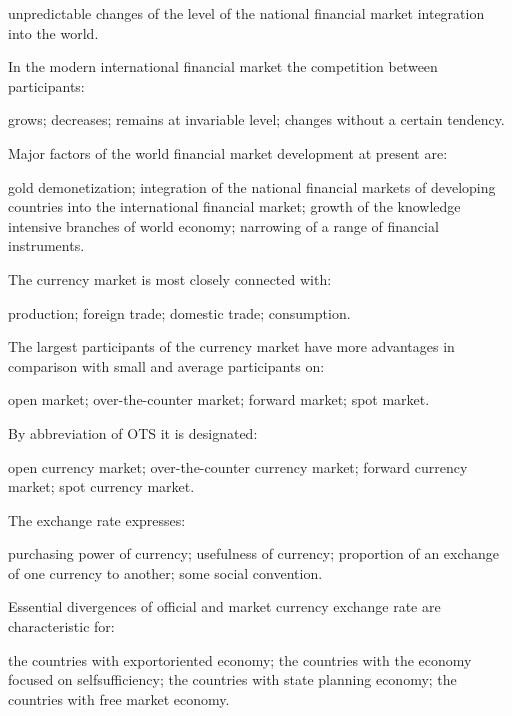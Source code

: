 \documentclass[12pt, table]{exam}
\begin{document}
\begin{questions}
\begin{multicols}{2}
\begin{choices}
	 \choice unpredictable changes of the level of the national financial market integration into the world.
	 \end{choices}
\question In the modern international financial market the competition between participants:
	 \begin{choices}
	 \CC grows;
	 \choice decreases;
	 \choice remains at invariable level;
	 \choice changes without a certain tendency.
	 \end{choices}
\question Major factors of the world financial market development at present are:
	 \begin{choices}
	 \choice gold demonetization;
	 \CC integration of the national financial markets of developing countries into the international financial market;
	 \choice growth of the knowledge intensive branches of world economy;
	 \choice narrowing of a range of financial instruments.
	 \end{choices}
\question The currency market is most closely connected with:
	 \begin{choices}
	 \choice production;
	 \CC foreign trade;
	 \choice domestic trade;
	 \choice consumption.
	 \end{choices}
\question The largest participants of the currency market have more advantages in comparison with small and average participants on:
	 \begin{choices}
	 \choice open market;
	 \CC over-the-counter market;
	 \choice forward market;
	 \choice spot market.
	 \end{choices}
\question By abbreviation of OTS it is designated:
	 \begin{choices}
	 \choice open currency market;
	 \CC over-the-counter currency market;
	 \choice forward currency market;
	 \choice spot currency market.
	 \end{choices}
\question The exchange rate expresses:
	 \begin{choices}
	 \choice purchasing power of currency;
	 \choice usefulness of currency;
	 \CC proportion of an exchange of one currency to another;
	 \choice some social convention.
	 \end{choices}
\question Essential divergences of official and market currency exchange rate are characteristic for:
	 \begin{choices}
	 \choice the countries with exportoriented economy;
	 \choice the countries with the economy focused on selfsufficiency;
	 \CC the countries with state planning economy;
	 \choice the countries with free market economy.
	 \end{choices}

\end{multicols}
\end{questions}
\end{document}
